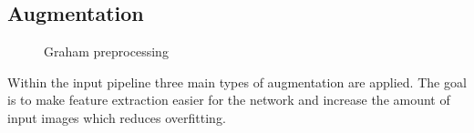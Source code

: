 \documentclass{article}
\begin{document}
\subsection{Augmentation}
\begin{figure}%
  \vspace{-10pt}
  \centering
  \hspace{0.5cm}
  \caption{Graham preprocessing}
  \label{fig:graham}
\end{figure}
Within the input pipeline three main types of augmentation are applied.
The goal is to make feature extraction easier for the network and increase the amount of input images which reduces overfitting.
\end{document}
